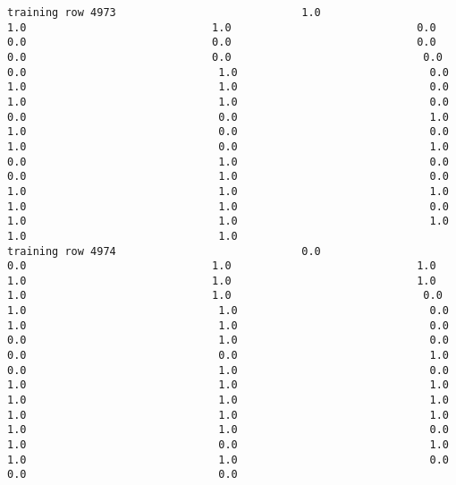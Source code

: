 \documentclass[11pt]{article}
\begin{document}
\begin{verbatim}
training row 4973                             1.0                             1.0                             1.0                             0.0                             0.0                             0.0                             0.0                             0.0                             0.0                              0.0                              0.0                              1.0                              0.0                              1.0                              1.0                              0.0                              1.0                              1.0                              0.0                              0.0                              0.0                              1.0                              1.0                              0.0                              0.0                              1.0                              0.0                              1.0                              0.0                              1.0                              0.0                              0.0                              1.0                              0.0                              1.0                              1.0                              1.0                              1.0                              1.0                              0.0                              1.0                              1.0                              1.0                              1.0                              1.0
training row 4974                             0.0                             0.0                             1.0                             1.0                             1.0                             1.0                             1.0                             1.0                             1.0                              0.0                              1.0                              1.0                              0.0                              1.0                              1.0                              0.0                              0.0                              1.0                              0.0                              0.0                              0.0                              1.0                              0.0                              1.0                              0.0                              1.0                              1.0                              1.0                              1.0                              1.0                              1.0                              1.0                              1.0                              1.0                              1.0                              1.0                              0.0                              1.0                              0.0                              1.0                              1.0                              1.0                              0.0                              0.0                              0.0

\end{verbatim}
\end{document}
